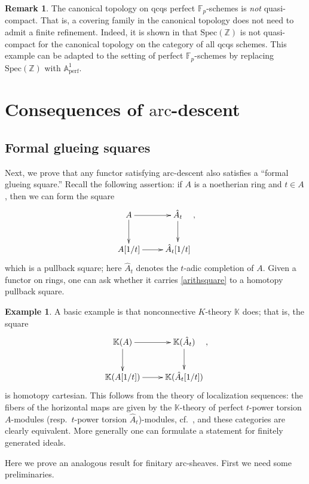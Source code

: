 \documentclass[reqno]{amsart}
\newcommand{\spec}{\mathrm{Spec}}
\newcommand{\arc}{\mathrm{arc}}
\theoremstyle{definition}
\newtheorem{remark}[theorem]{Remark}
\newtheorem{example}[theorem]{Example}
\begin{document}
\begin{remark}
The canonical topology on qcqs perfect $\mathbb{F}_p$-schemes is \emph{not} quasi-compact. That is, a covering family in the canonical topology does not need to admit a  finite refinement.  Indeed, it is shown in \cite[Tag 0EUE]{stacks-project} that $\spec( \mathbb{Z})$ is not quasi-compact for the canonical topology on the category of all qcqs schemes. This example can be adapted to the setting of perfect $\mathbb{F}_p$-schemes by replacing $\spec(\mathbb{Z})$ with $\mathbb{A}^1_{\mathrm{perf}}$.
\end{remark}

\newpage
\section{Consequences of $\arc$-descent}

\subsection{Formal glueing squares}
Next, we prove that any functor satisfying $\arc$-descent also satisfies a
``formal glueing square.''
Recall the following assertion: if $A$ is a noetherian ring and  $t \in A$,
then we can form the {square} 
\begin{equation} \label{arithsquare}  \begin{aligned}\xymatrix{
A \ar[d]  \ar[r] & \hat{A}_t \ar[d]  \\
A[1/t] \ar[r] &  \hat{A}_t[1/t]
}, \end{aligned} \end{equation}
which is a pullback square; here $\hat{A}_t$ denotes the $t$-adic completion of
$A$. 
Given a functor on rings, one can ask whether it carries 
\eqref{arithsquare} to 
 a homotopy pullback square. 

\begin{example} 

A basic example is that nonconnective $K$-theory $\mathbb{K}$ does; that is, the
square
\[ \xymatrix{
\mathbb{K}(A) \ar[d]  \ar[r] &  \mathbb{K}( \hat{A}_t) \ar[d]  \\
\mathbb{K}(A[1/t]) \ar[r] &  \mathbb{K}( \hat{A}_t[1/t])
},\]
is homotopy cartesian. 
This follows from the theory of localization sequences: the fibers of the horizontal maps are given by the $\mathbb{K}$-theory of perfect
$t$-power torsion $A$-modules (resp.~$t$-power torsion $\hat{A}_t$)-modules,
cf.~\cite[Theorem 5.1]{TT}, and these categories are clearly equivalent. 
More generally one can formulate a statement 
for finitely generated ideals. 

\end{example} 
Here we prove an analogous result for finitary $\arc$-sheaves. First we need
some preliminaries. 
\end{document}
